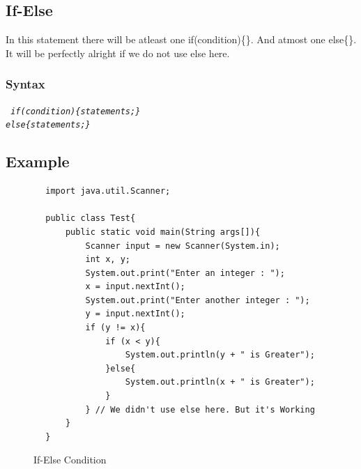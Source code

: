 \documentclass[openany]{book}  %
\begin{document}
\begin{flushleft}
    \subsection{If-Else}
    In this statement there will be atleast one if(condition)\{\}. And atmost one else\{\}. It will be perfectly alright if we do not use else here.
    \subsubsection{Syntax}
    \begin{center}
        \tt{
            \textit{if(condition)\{statements;\}\\else\{statements;\}}
        }
    \end{center}

    \newpage

    \subsection{Example}
    \begin{center}
        \begin{verbatim}
        import java.util.Scanner;

        public class Test{
            public static void main(String args[]){
                Scanner input = new Scanner(System.in);
                int x, y;
                System.out.print("Enter an integer : ");
                x = input.nextInt();
                System.out.print("Enter another integer : ");
                y = input.nextInt();
                if (y != x){
                    if (x < y){
                        System.out.println(y + " is Greater");
                    }else{
                        System.out.println(x + " is Greater");
                    }
                } // We didn't use else here. But it's Working
            }
        }
    \end{verbatim}
    \end{center}
    \begin{figure}[htbp]
        \begin{center}
            \caption{If-Else Condition}
        \end{center}
    \end{figure}

\end{flushleft}
\end{document}
